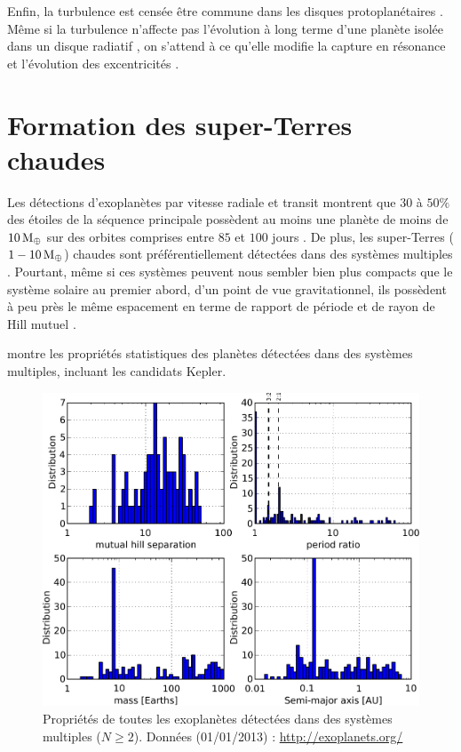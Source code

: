 Enfin, la turbulence est censée être commune dans les disques protoplanétaires \citep{armitage2011dynamics}. Même si la turbulence n'affecte pas l'évolution à long terme d'une planète isolée dans un disque radiatif \citep{pierens2012protoplanetary}, on s'attend à ce qu'elle modifie la capture en résonance et l'évolution des excentricités \citep[voir][]{pierens2011dynamics}.

\section{Formation des super-Terres chaudes}\label{sec:4.2}
Les détections d'exoplanètes par vitesse radiale et transit montrent que $30$ à $50\%$ des étoiles de la séquence principale possèdent au moins une planète de moins de $10\mathrm{\thinspace M_\oplus}$ sur des orbites comprises entre $85$ et $100$ jours \citep{mayor2011road, howard2010occurrence, howard2012occurrence, fressin2013false}. De plus, les super-Terres ($1-10\mathrm{\thinspace M_\oplus}$) chaudes sont préférentiellement détectées dans des systèmes multiples \citep{udry2007statistical, lissauer2011architecture}. Pourtant, même si ces systèmes peuvent nous sembler bien plus compacts que le système solaire au premier abord, d'un point de vue gravitationnel, ils possèdent à peu près le même espacement en terme de rapport de période et de rayon de Hill mutuel \citep{fang2013planetary}.


 montre les propriétés statistiques des planètes détectées dans des systèmes multiples, incluant les candidats Kepler.%

\begin{figure}[htbp]
\centering
\includegraphics[width=0.8\linewidth]{figure/multiplanet_systems_stats.pdf}
\caption{Propriétés de toutes les exoplanètes détectées dans des systèmes multiples ($N\geqslant 2$). Données (01/01/2013) : \url{http://exoplanets.org/}}\label{fig:multiplanet_stats}
\end{figure}

